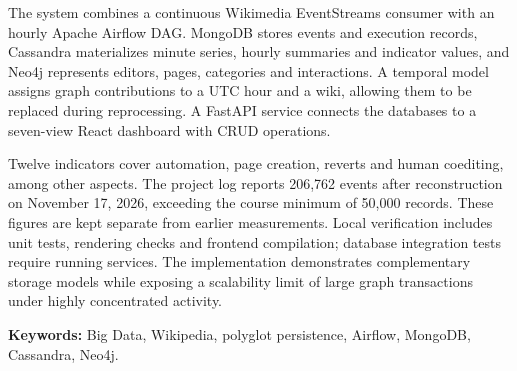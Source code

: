 The system combines a continuous Wikimedia EventStreams consumer with an hourly Apache Airflow DAG. MongoDB stores events and execution records, Cassandra materializes minute series, hourly summaries and indicator values, and Neo4j represents editors, pages, categories and interactions. A temporal model assigns graph contributions to a UTC hour and a wiki, allowing them to be replaced during reprocessing. A FastAPI service connects the databases to a seven-view React dashboard with CRUD operations.

Twelve indicators cover automation, page creation, reverts and human coediting, among other aspects. The project log reports 206,762 events after reconstruction on November 17, 2026, exceeding the course minimum of 50,000 records. These figures are kept separate from earlier measurements. Local verification includes unit tests, rendering checks and frontend compilation; database integration tests require running services. The implementation demonstrates complementary storage models while exposing a scalability limit of large graph transactions under highly concentrated activity.

\noindent\textbf{Keywords:} Big Data, Wikipedia, polyglot persistence, Airflow, MongoDB, Cassandra, Neo4j.
